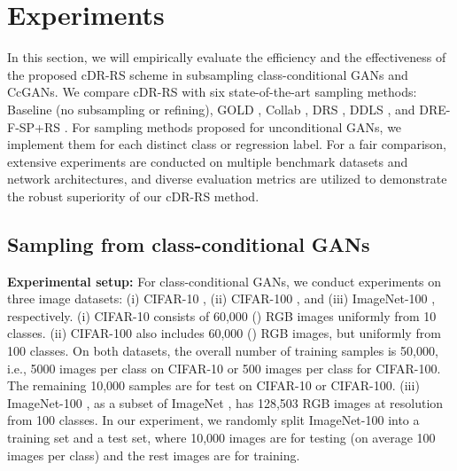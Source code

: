 \documentclass[final,12pt, 3p,times]{elsarticle}
\begin{document}
\section{Experiments}\label{sec:experiment}
In this section, we will empirically evaluate the efficiency and the effectiveness of the proposed cDR-RS scheme in subsampling class-conditional GANs and CcGANs. We compare cDR-RS with six state-of-the-art sampling methods: Baseline (no subsampling or refining), GOLD \cite{mo2019mining}, Collab \cite{liu2020collaborative}, DRS \cite{azadi2018discriminator}, DDLS \cite{che2020your}, and DRE-F-SP+RS \cite{ding2020subsampling}. For sampling methods proposed for unconditional GANs, we implement them for each distinct class or regression label. For a fair comparison, extensive experiments are conducted on multiple benchmark datasets and network architectures, and diverse evaluation metrics are utilized to demonstrate the robust superiority of our cDR-RS method. 


\subsection{Sampling from class-conditional GANs}\label{sec:experiment_classification}

{\setlength{\parindent}{0cm} \textbf{Experimental setup:}}
For class-conditional GANs, we conduct experiments on three image datasets: (i) CIFAR-10 \cite{krizhevsky2009learning}, (ii) CIFAR-100 \cite{krizhevsky2009learning}, and (iii) ImageNet-100 \cite{cao2017hashnet}, respectively. (i) CIFAR-10 consists of 60,000 () RGB images uniformly from 10 classes. (ii) CIFAR-100 also includes 60,000 () RGB images, but uniformly from 100 classes.  On both datasets, the overall number of training samples is 50,000, i.e., 5000 images per class on CIFAR-10 or 500 images per class for CIFAR-100. The remaining 10,000 samples are for test on CIFAR-10 or CIFAR-100. (iii) ImageNet-100 \cite{cao2017hashnet}, as a subset of ImageNet \cite{imagenet_cvpr09}, has 128,503 RGB images at  resolution from 100 classes. In our experiment, we randomly split ImageNet-100 into a training set and a test set, where 10,000 images are for testing (on average 100 images per class) and the rest images are for training. 
\end{document}
